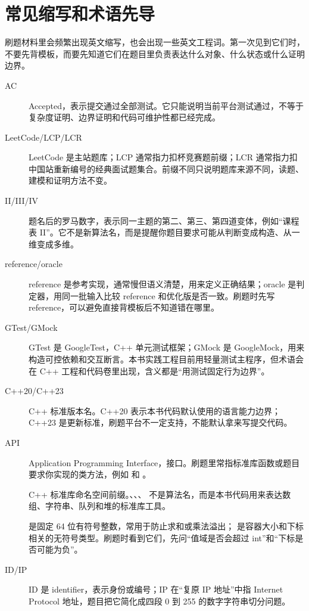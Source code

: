 \chapter*{常见缩写和术语先导}

刷题材料里会频繁出现英文缩写，也会出现一些英文工程词。第一次见到它们时，不要先背模板，而要先知道它们在题目里负责表达什么对象、什么状态或什么证明边界。

\begin{description}
  \item[AC] Accepted，表示提交通过全部测试。它只能说明当前平台测试通过，不等于复杂度证明、边界证明和代码可维护性都已经完成。
  \item[LeetCode/LCP/LCR] LeetCode 是主站题库；LCP 通常指力扣杯竞赛题前缀；LCR 通常指力扣中国站重新编号的经典面试题集合。前缀不同只说明题库来源不同，读题、建模和证明方法不变。
  \item[II/III/IV] 题名后的罗马数字，表示同一主题的第二、第三、第四道变体，例如“课程表 II”。它不是新算法名，而是提醒你题目要求可能从判断变成构造、从一维变成多维。
  \item[reference/oracle] reference 是参考实现，通常慢但语义清楚，用来定义正确结果；oracle 是判定器，用同一批输入比较 reference 和优化版是否一致。刷题时先写 reference，可以避免直接背模板后不知道错在哪里。
  \item[GTest/GMock] GTest 是 GoogleTest，C++ 单元测试框架；GMock 是 GoogleMock，用来构造可控依赖和交互断言。本书实践工程目前用轻量测试主程序，但术语会在 C++ 工程和代码卷里出现，含义都是“用测试固定行为边界”。
  \item[C++20/C++23] C++ 标准版本名。C++20 表示本书代码默认使用的语言能力边界；C++23 是更新标准，刷题平台不一定支持，不能默认拿来写提交代码。
  \item[API] Application Programming Interface，接口。刷题里常指标准库函数或题目要求你实现的类方法，例如  和 。
  \item[] C++ 标准库命名空间前缀。、、、 不是算法名，而是本书代码用来表达数组、字符串、队列和堆的标准库工具。
  \item[]  是固定 64 位有符号整数，常用于防止求和或乘法溢出； 是容器大小和下标相关的无符号类型。刷题时看到它们，先问“值域是否会超过 int”和“下标是否可能为负”。
  \item[ID/IP] ID 是 identifier，表示身份或编号；IP 在“复原 IP 地址”中指 Internet Protocol 地址，题目把它简化成四段 0 到 255 的数字字符串切分问题。

\end{description}

